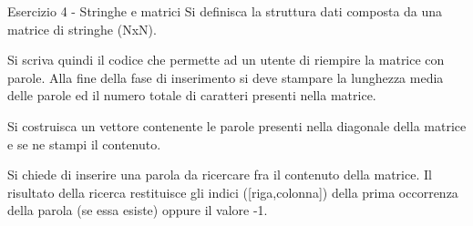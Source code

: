 \documentclass[]{beamer}
\begin{document}
\begin{frame}{Esercizio 4 - Stringhe e matrici}
Si definisca la struttura dati composta da una matrice di stringhe (NxN).

Si scriva quindi il codice che permette ad un utente di riempire la matrice con parole.
Alla fine della fase di inserimento si deve stampare la lunghezza media delle parole ed il numero
totale di caratteri presenti nella matrice.

Si costruisca un vettore contenente le parole presenti nella diagonale della matrice e se ne stampi
il contenuto.

Si chiede di inserire una parola da ricercare fra il contenuto della matrice. Il risultato della ricerca restituisce gli indici ([riga,colonna]) della prima occorrenza della parola (se essa esiste) oppure il valore -1.
\end{frame}
\end{document}
